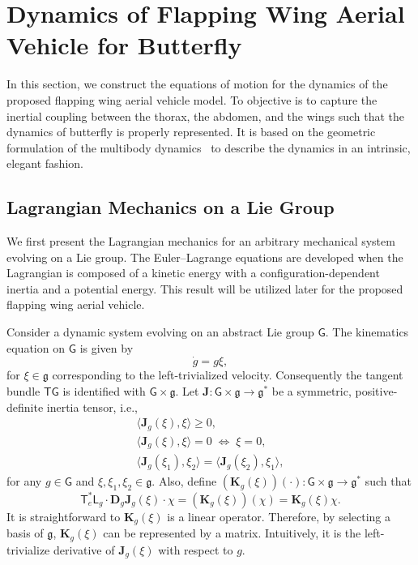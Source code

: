 \documentclass[conf]{new-aiaa}
\newcommand{\pair}[1]{\ensuremath{\langle #1 \rangle}}
\newcommand{\T}{\ensuremath{\mathsf{T}}}
\renewcommand{\L}{\ensuremath{\mathsf{L}}}
\newcommand{\D}{\ensuremath{\mathbf{D}}}
\newcommand{\G}{\ensuremath{\mathsf{G}}}
\newcommand{\g}{\ensuremath{\mathfrak{g}}}
\begin{document}
\section{Dynamics of Flapping Wing Aerial Vehicle for Butterfly}

In this section, we construct the equations of motion for the dynamics of the proposed flapping wing aerial vehicle model. 
To objective is to capture the inertial coupling between the thorax, the abdomen, and the wings such that the dynamics of butterfly is properly represented. 
It is based on the geometric formulation of the multibody dynamics~\cite{LeeLeo17} to describe the dynamics in an intrinsic, elegant fashion. 

\subsection{Lagrangian Mechanics on a Lie Group}

We first present the Lagrangian mechanics for an arbitrary mechanical system evolving on a Lie group. 
The Euler--Lagrange equations are developed when the Lagrangian is composed of a kinetic energy with a configuration-dependent inertia and a potential energy.
This result will be utilized later for the proposed flapping wing aerial vehicle.

Consider a dynamic system evolving on an abstract Lie group $\G$. 
The kinematics equation on $\G$ is given by
\begin{equation}
    \dot g = g \xi,\label{eqn:dot_g}
\end{equation}
for $\xi\in\g$ corresponding to the left-trivialized velocity.
Consequently the tangent bundle $\T\G$ is identified with $\G\times \g$.
Let $\mathbf{J}:\G\times \g\rightarrow \g^*$ be a symmetric, positive-definite inertia tensor, i.e., 
\begin{gather*}
    \pair{\mathbf{J}_g(\xi), \xi} \geq 0,\\
    \pair{\mathbf{J}_g(\xi), \xi} = 0\; \Leftrightarrow \; \xi=0, \\ 
    \pair{\mathbf{J}_g(\xi_1), \xi_2} = \pair{\mathbf{J}_g(\xi_2), \xi_1},
\end{gather*}
for any $g\in\G$ and $\xi,\xi_1,\xi_2\in\g$. 
Also, define $(\mathbf{K}_g(\xi))(\cdot):\G\times \g\rightarrow \g^*$ such that
\begin{equation}
    \T_e^* \L_g \cdot \D_g \mathbf{J}_g(\xi) \cdot \chi = (\mathbf{K}_g(\xi)) (\chi) = \mathbf{K}_g(\xi)\chi. \label{eqn:KK}
\end{equation}
It is straightforward to $\mathbf{K}_g(\xi)$ is a linear operator.
Therefore, by selecting a basis of $\g$, $\mathbf{K}_g(\xi)$ can be represented by a matrix.
Intuitively, it is the left-trivialize derivative of $\mathbf{J}_g(\xi)$ with respect to $g$. 
\end{document}
